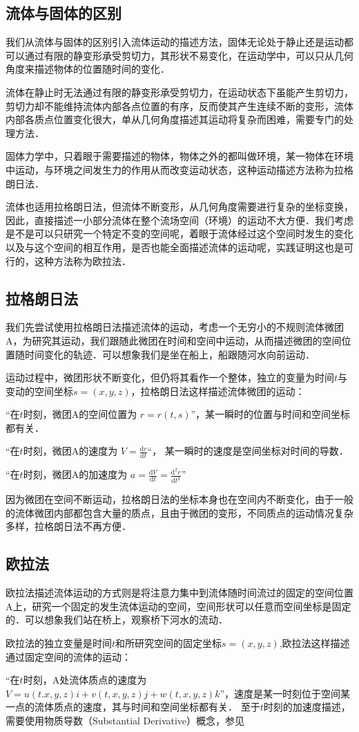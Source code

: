 \subsection{流体与固体的区别}
我们从流体与固体的区别引入流体运动的描述方法，固体无论处于静止还是运动都可以通过有限的静变形承受剪切力，其形状不易变化，在运动学中，可以只从几何角度来描述物体的位置随时间的变化．

流体在静止时无法通过有限的静变形承受剪切力，在运动状态下虽能产生剪切力，剪切力却不能维持流体内部各点位置的有序，反而使其产生连续不断的变形，流体内部各质点位置变化很大，单从几何角度描述其运动将复杂而困难，需要专门的处理方法．

固体力学中，只着眼于需要描述的物体，物体之外的都叫做环境，某一物体在环境中运动，与环境之间发生力的作用从而改变运动状态，这种运动描述方法称为拉格朗日法．

流体也适用拉格朗日法，但流体不断变形，从几何角度需要进行复杂的坐标变换，因此，直接描述一小部分流体在整个流场空间（环境）的运动不大方便．我们考虑是不是可以只研究一个特定不变的空间呢，着眼于流体经过这个空间时发生的变化以及与这个空间的相互作用，是否也能全面描述流体的运动呢，实践证明这也是可行的，这种方法称为欧拉法．

\subsection{拉格朗日法}
我们先尝试使用拉格朗日法描述流体的运动，考虑一个无穷小的不规则流体微团A，为研究其运动，我们跟随此微团在时间和空间中运动，从而描述微团的空间位置随时间变化的轨迹．可以想象我们是坐在船上，船跟随河水向前运动．

运动过程中，微团形状不断变化，但仍将其看作一个整体，独立的变量为时间$t$与变动的空间坐标$s=(x,y,z)$，拉格朗日法这样描述流体微团的运动：

“在$t$时刻，微团A的空间位置为 $r=r(t,s)$”，某一瞬时的位置与时间和空间坐标都有关．

“在$t$时刻，微团A的速度为 $V=\frac{\mathrm{d} r}{\mathrm{d} t}$“，
某一瞬时的速度是空间坐标对时间的导数．

“在$t$时刻，微团A的加速度为 $a=\frac{\mathrm{d} V}{\mathrm{d} t}=\frac{\mathrm{d}^2 r}{\mathrm{d} t^2}$”

因为微团在空间不断运动，拉格朗日法的坐标本身也在空间内不断变化，由于一般的流体微团内部都包含大量的质点，且由于微团的变形，不同质点的运动情况复杂多样，拉格朗日法不再方便．

\subsection{欧拉法}
欧拉法描述流体运动的方式则是将注意力集中到流体随时间流过的固定的空间位置A上，研究一个固定的发生流体运动的空间，空间形状可以任意而空间坐标是固定的．可以想象我们站在桥上，观察桥下河水的流动．

欧拉法的独立变量是时间$t$和所研究空间的固定坐标$s=(x,y,z)$,欧拉法这样描述通过固定空间的流体的运动：

“在$t$时刻，A处流体质点的速度为$V=u(t.x,y,z)i+v(t,x,y,z)j+w(t,x,y,z)k$”，速度是某一时刻位于空间某一点的流体质点的速度，其与时间和空间坐标都有关．
至于$t$时刻的加速度描述，需要使用物质导数（Substantial  Derivative）概念，参见
